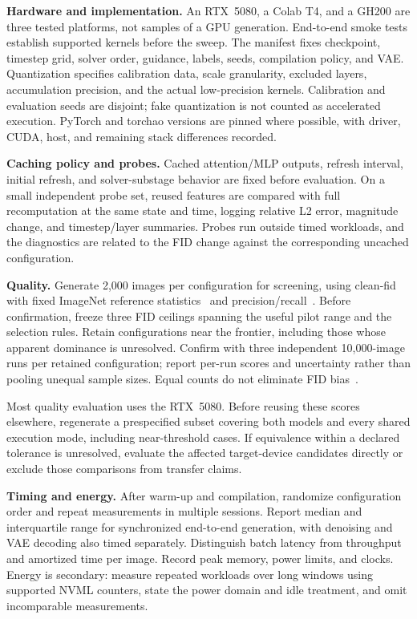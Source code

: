 \documentclass[conference]{IEEEtran}
\begin{document}
\textbf{Hardware and implementation.} An RTX~5080, a Colab T4, and a GH200 are three tested platforms, not
samples of a GPU generation. End-to-end smoke tests establish supported kernels before the sweep. The manifest
fixes checkpoint, timestep grid, solver order, guidance, labels, seeds, compilation policy, and VAE.
Quantization specifies calibration data, scale granularity, excluded layers, accumulation precision, and the
actual low-precision kernels. Calibration and evaluation seeds are disjoint; fake quantization is not counted
as accelerated execution. PyTorch and torchao versions are pinned where possible, with driver, CUDA, host, and
remaining stack differences recorded.

\textbf{Caching policy and probes.} Cached attention/MLP outputs, refresh interval, initial refresh, and
solver-substage behavior are fixed before evaluation. On a small independent probe set, reused features are
compared with full recomputation at the same state and time, logging relative L2 error, magnitude change, and
timestep/layer summaries. Probes run outside timed workloads, and the diagnostics are related to the FID change
against the corresponding uncached configuration.

\textbf{Quality.} Generate 2,000 images per configuration for screening, using clean-fid with fixed ImageNet
reference statistics~\cite{parmar2022cleanfid} and precision/recall~\cite{kynkaanniemi2019prd}. Before
confirmation, freeze three FID ceilings spanning the useful pilot range and the selection rules. Retain
configurations near the frontier, including those whose apparent dominance is unresolved. Confirm with three
independent 10,000-image runs per retained configuration; report per-run scores and uncertainty rather than
pooling unequal sample sizes. Equal counts do not eliminate FID bias~\cite{chong2020unbiased}.

Most quality evaluation uses the RTX~5080. Before reusing these scores elsewhere, regenerate a prespecified
subset covering both models and every shared execution mode, including near-threshold cases. If equivalence
within a declared tolerance is unresolved, evaluate the affected target-device candidates directly or exclude
those comparisons from transfer claims.

\textbf{Timing and energy.} After warm-up and compilation, randomize configuration order and repeat
measurements in multiple sessions. Report median and interquartile range for synchronized end-to-end
generation, with denoising and VAE decoding also timed separately. Distinguish batch latency from throughput
and amortized time per image. Record peak memory, power limits, and clocks. Energy is secondary: measure
repeated workloads over long windows using supported NVML counters, state the power domain and idle treatment,
and omit incomparable measurements.
\end{document}
